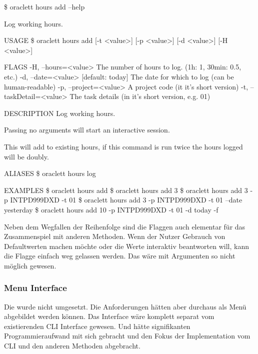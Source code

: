 \documentclass[oneside,bibliography=totocnumbered,BCOR=5mm]{scrbook}
\newenvironment{code}{\captionsetup{type=listing, skip=0pt}}{}
\begin{document}
\begin{code}
  \begin{shellcode}
\$ oraclett hours add --help

Log working hours.

USAGE
  \$ oraclett hours add [-t <value>] [-p <value>] [-d <value>] [-H <value>]

FLAGS
  -H, --hours=<value>       The number of hours to log. (1h: 1, 30min: 0.5, etc.)
  -d, --date=<value>        [default: today] The date for which to log (can be human-readable)
  -p, --project=<value>     A project code (it it's short version)
  -t, --taskDetail=<value>  The task details (in it's short version, e.g. 01)

DESCRIPTION
  Log working hours.

  Passing no arguments will start an interactive session.

  This will add to existing hours, if this command is run twice the hours logged will be doubly.

ALIASES
  \$ oraclett hours log

EXAMPLES
  \$ oraclett hours add
  \$ oraclett hours add 3
  \$ oraclett hours add 3 -p INTPD999DXD -t 01
  \$ oraclett hours add 3 -p INTPD999DXD -t 01 --date yesterday
  \$ oraclett hours add 10 -p INTPD999DXD -t 01 -d today -f
  \end{shellcode}
  \medskip
\end{code}

Neben dem
Wegfallen der Reihenfolge sind die Flaggen auch elementar für das Zusammenspiel
mit anderen Methoden. Wenn der Nutzer Gebrauch von Defaultwerten machen möchte
oder die Werte interaktiv beantworten will, kann die Flagge einfach weg gelassen
werden. Das wäre mit Argumenten so nicht möglich gewesen.




\subsubsection{Menu Interface}

Die  wurde nicht umgesetzt. Die Anforderungen hätten aber durchaus
als Menü abgebildet werden können. Das Interface wäre komplett separat vom
existierenden CLI Interface gewesen. Und hätte signifikanten Programmieraufwand
mit sich gebracht und den Fokus der Implementation vom CLI und den anderen
Methoden abgebracht.
\end{document}
